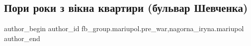  
 
 
 
 

\subsection{Пори роки з вікна квартири (бульвар Шевченка)}
\label{sec:09_02_2023.fb.fb_group.mariupol.pre_war.4.pori_roki_z_v_kna_kv}
 
\ifcmt
 author_begin
   author_id fb_group.mariupol.pre_war,nagorna_iryna.mariupol
 author_end
\fi

